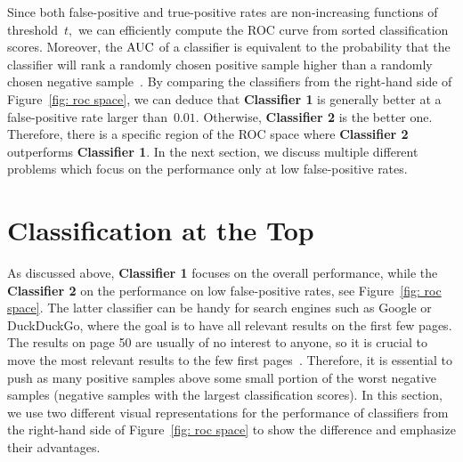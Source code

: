 Since both false-positive and true-positive rates are non-increasing functions of threshold~$t,$ we can efficiently compute the ROC curve from sorted classification scores. Moreover, the $\operatorname{AUC}$ of a classifier is equivalent to the probability that the classifier will rank a randomly chosen positive sample higher than a randomly chosen negative sample~\cite{fawcett2006introduction}. By comparing the classifiers from the right-hand side of Figure~\ref{fig: roc space}, we can deduce that \textbf{Classifier 1} is generally better at a false-positive rate larger than~$0.01.$ Otherwise, \textbf{Classifier 2} is the better one. Therefore,  there is a specific region of the ROC space where \textbf{Classifier 2} outperforms \textbf{Classifier 1}. In the next section, we discuss multiple different problems which focus on the performance only at low false-positive rates.

\section{Classification at the Top}\label{sec: related problems}

As discussed above, \textbf{Classifier 1} focuses on the overall performance, while the  \textbf{Classifier 2} on the performance on low false-positive rates, see Figure~\ref{fig: roc space}. The latter classifier can be handy for search engines such as Google or DuckDuckGo, where the goal is to have all relevant results on the first few pages. The results on page 50 are usually of no interest to anyone, so it is crucial to move the most relevant results to the few first pages~\cite{cortes2003auc, joachims2002optimizing}. Therefore, it is essential to push as many positive samples above some small portion of the worst negative samples (negative samples with the largest classification scores). In this section, we use two different visual representations for the performance of classifiers from the right-hand side of Figure~\ref{fig: roc space} to show the difference and emphasize their advantages.

